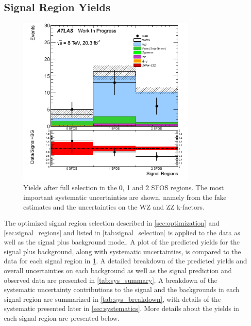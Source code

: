 \subsection{Signal Region Yields}
\label{sec:signal_yield}
\begin{figure}[ht!]
\centering
\includegraphics[width=0.8\textwidth]{figures/SFOSSignalRegions.png}
\caption{Yields after full selection in the 0, 1 and 2 SFOS regions.  
The most important systematic uncertainties are shown, namely from the 
fake estimates and the uncertainties on the WZ and ZZ k-factors.}
\label{fig:sig_yields_nsfos}
\end{figure}

The optimized signal region selection
described in \sec\ref{sec:optimization} and \sec\ref{sec:signal_regions}
and listed in \tab\ref{tab:signal_selection} is applied 
to the data as well as the signal plus background model.
A plot of the predicted yields for the 
signal plus background, along with systematic uncertainties,
is compared to the data for each signal region
in \fig\ref{fig:sig_yields_nsfos}. A detailed 
breakdown of the predicted yields and overall uncertainties
on each background as well as the signal prediction and observed
data
are presented in \tab\ref{tab:sys_summary}.
A breakdown of the systematic uncertainty contributions
to the signal and the backgrounds in each signal region
are summarized in \tab\ref{tab:sys_breakdown}, with details
of the systematic presented later in \sec\ref{sec:systematics}.
More details about the yields in each signal region are 
presented below.



